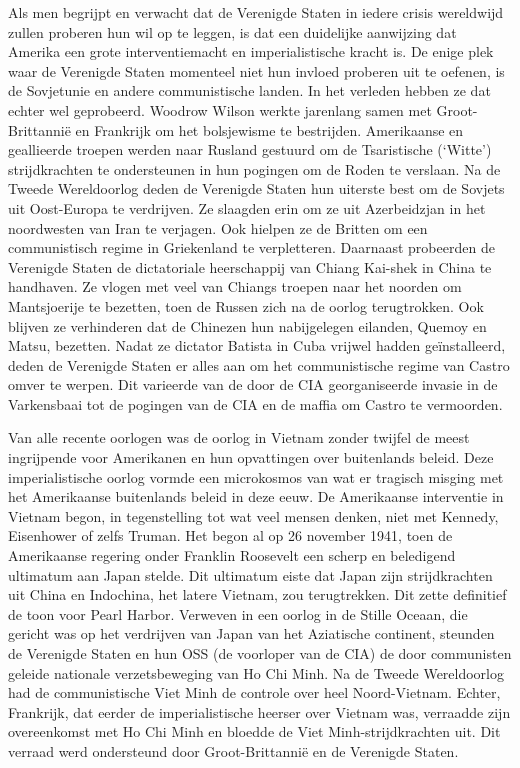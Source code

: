 \documentclass[
  a5paper,
  smalldemyvopaper,10pt,twoside,onecolumn,openright,extrafontsizes,hidelinks]{memoir}
\begin{document}
Als men begrijpt en verwacht dat de Verenigde Staten in iedere crisis
wereldwijd zullen proberen hun wil op te leggen, is dat een duidelijke
aanwijzing dat Amerika een grote interventiemacht en imperialistische
kracht is. De enige plek waar de Verenigde Staten momenteel niet hun
invloed proberen uit te oefenen, is de Sovjetunie en andere
communistische landen. In het verleden hebben ze dat echter wel
geprobeerd. Woodrow Wilson werkte jarenlang samen met Groot-Brittannië
en Frankrijk om het bolsjewisme te bestrijden. Amerikaanse en
geallieerde troepen werden naar Rusland gestuurd om de Tsaristische
(`Witte') strijdkrachten te ondersteunen in hun pogingen om de Roden te
verslaan. Na de Tweede Wereldoorlog deden de Verenigde Staten hun
uiterste best om de Sovjets uit Oost-Europa te verdrijven. Ze slaagden
erin om ze uit Azerbeidzjan in het noordwesten van Iran te verjagen. Ook
hielpen ze de Britten om een communistisch regime in Griekenland te
verpletteren. Daarnaast probeerden de Verenigde Staten de dictatoriale
heerschappij van Chiang Kai-shek in China te handhaven. Ze vlogen met
veel van Chiangs troepen naar het noorden om Mantsjoerije te bezetten,
toen de Russen zich na de oorlog terugtrokken. Ook blijven ze
verhinderen dat de Chinezen hun nabijgelegen eilanden, Quemoy en Matsu,
bezetten. Nadat ze dictator Batista in Cuba vrijwel hadden
geïnstalleerd, deden de Verenigde Staten er alles aan om het
communistische regime van Castro omver te werpen. Dit varieerde van de
door de CIA georganiseerde invasie in de Varkensbaai tot de pogingen van
de CIA en de maffia om Castro te vermoorden.

Van alle recente oorlogen was de oorlog in Vietnam zonder twijfel de
meest ingrijpende voor Amerikanen en hun opvattingen over buitenlands
beleid. Deze imperialistische oorlog vormde een microkosmos van wat er
tragisch misging met het Amerikaanse buitenlands beleid in deze eeuw. De
Amerikaanse interventie in Vietnam begon, in tegenstelling tot wat veel
mensen denken, niet met Kennedy, Eisenhower of zelfs Truman. Het begon
al op 26 november 1941, toen de Amerikaanse regering onder Franklin
Roosevelt een scherp en beledigend ultimatum aan Japan stelde. Dit
ultimatum eiste dat Japan zijn strijdkrachten uit China en Indochina,
het latere Vietnam, zou terugtrekken. Dit zette definitief de toon voor
Pearl Harbor. Verweven in een oorlog in de Stille Oceaan, die gericht
was op het verdrijven van Japan van het Aziatische continent, steunden
de Verenigde Staten en hun OSS (de voorloper van de CIA) de door
communisten geleide nationale verzetsbeweging van Ho Chi Minh. Na de
Tweede Wereldoorlog had de communistische Viet Minh de controle over
heel Noord-Vietnam. Echter, Frankrijk, dat eerder de imperialistische
heerser over Vietnam was, verraadde zijn overeenkomst met Ho Chi Minh en
bloedde de Viet Minh-strijdkrachten uit. Dit verraad werd ondersteund
door Groot-Brittannië en de Verenigde Staten.
\end{document}
